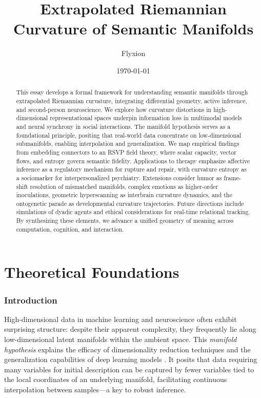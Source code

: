 \documentclass{article}
\title{Extrapolated Riemannian Curvature of Semantic Manifolds}
\author{Flyxion}
\date{\today}
\theoremstyle{definition}
\begin{document}
\maketitle

\begin{abstract}

This essay develops a formal framework for understanding semantic manifolds through extrapolated Riemannian curvature, integrating differential geometry, active inference, and second-person neuroscience. We explore how curvature distortions in high-dimensional representational spaces underpin information loss in multimodal models and neural synchrony in social interactions. The manifold hypothesis serves as a foundational principle, positing that real-world data concentrate on low-dimensional submanifolds, enabling interpolation and generalization. We map empirical findings from embedding connectors to an RSVP field theory, where scalar capacity, vector flows, and entropy govern semantic fidelity. Applications to therapy emphasize affective inference as a regulatory mechanism for rupture and repair, with curvature entropy as a sociomarker for interpersonalized psychiatry. Extensions consider humor as frame-shift resolution of mismatched manifolds, complex emotions as higher-order inoculations, geometric hyperscanning as interbrain curvature dynamics, and the ontogenetic parade as developmental curvature trajectories. Future directions include simulations of dyadic agents and ethical considerations for real-time relational tracking. By synthesizing these elements, we advance a unified geometry of meaning across computation, cognition, and interaction.
\end{abstract}

\tableofcontents

\part{Theoretical Foundations}

\section{Introduction}

High-dimensional data in machine learning and neuroscience often exhibit surprising structure: despite their apparent complexity, they frequently lie along low-dimensional latent manifolds within the ambient space. This \emph{manifold hypothesis} \cite{fefferman2016testing,gorban2018blessing,olah2014blog,cayton2005algorithms} explains the efficacy of dimensionality reduction techniques and the generalization capabilities of deep learning models \cite{chollet2021deep}. It posits that data requiring many variables for initial description can be captured by fewer variables tied to the local coordinates of an underlying manifold, facilitating continuous interpolation between samples—a key to robust inference.
\end{document}
